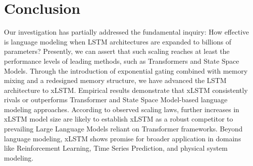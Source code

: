 \section{Conclusion}
Our investigation has partially addressed the fundamental inquiry: How effective is language modeling when LSTM architectures are expanded to billions of parameters? Presently, we can assert that such scaling reaches at least the performance levels of leading methods, such as Transformers and State Space Models. Through the introduction of exponential gating combined with memory mixing and a redesigned memory structure, we have advanced the LSTM architecture to xLSTM. Empirical results demonstrate that xLSTM consistently rivals or outperforms Transformer and State Space Model-based language modeling approaches. According to observed scaling laws, further increases in xLSTM model size are likely to establish xLSTM as a robust competitor to prevailing Large Language Models reliant on Transformer frameworks. Beyond language modeling, xLSTM shows promise for broader application in domains like Reinforcement Learning, Time Series Prediction, and physical system modeling.

